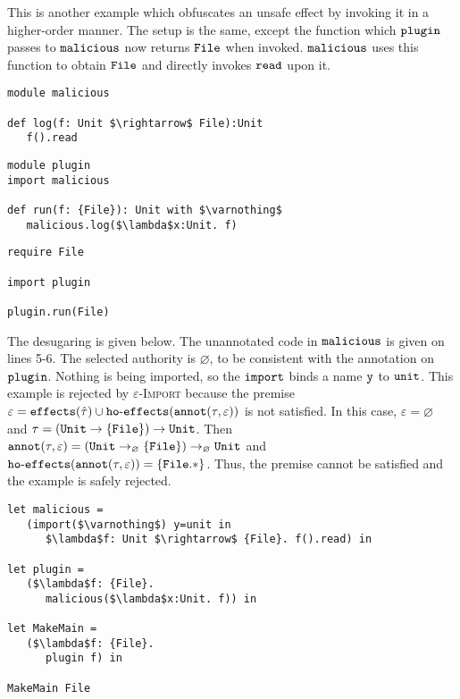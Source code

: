 This is another example which obfuscates an unsafe effect by invoking it in a higher-order manner. The setup is the same, except the function which $\mathtt{plugin}$ passes to $\mathtt{malicious}$ now returns $\mathtt{File}$ when invoked. $\mathtt{malicious}$ uses this function to obtain $\mathtt{File}$ and directly invokes $\mathtt{read}$ upon it.

\begin{lstlisting}
module malicious

def log(f: Unit $\rightarrow$ File):Unit
   f().read
\end{lstlisting}

\begin{lstlisting}
module plugin
import malicious

def run(f: {File}): Unit with $\varnothing$
   malicious.log($\lambda$x:Unit. f)
\end{lstlisting}

\begin{lstlisting}
require File

import plugin

plugin.run(File)
\end{lstlisting}

The desugaring is given below. The unannotated code in $\mathtt{malicious}$ is given on lines 5-6. The selected authority is $\varnothing$, to be consistent with the annotation on $\mathtt{plugin}$. Nothing is being imported, so the $\mathtt{import}$ binds a name $\mathtt{y}$ to $\mathtt{unit}$. This example is rejected by \textsc{$\varepsilon$-Import} because the premise $\varepsilon = \mathtt{effects}(\hat \tau) \cup \mathtt{ho \hbox{-} effects}(\mathtt{annot}(\tau, \varepsilon))$ is not satisfied. In this case, $\varepsilon = \varnothing$ and $\tau = \mathtt{ (Unit \rightarrow \{ File \}) \rightarrow Unit }$. Then $\mathtt{annot}(\tau, \varepsilon) = \mathtt{ (Unit \rightarrow_{\varnothing} \{ File \}) \rightarrow_{\varnothing} Unit }$ and $\mathtt{ho \hbox{-} effects}(\mathtt{annot}(\tau, \varepsilon)) = \{ \mathtt{File.*} \}$. Thus, the premise cannot be satisfied and the example is safely rejected.


\begin{lstlisting}
let malicious =
   (import($\varnothing$) y=unit in
      $\lambda$f: Unit $\rightarrow$ {File}. f().read) in

let plugin =
   ($\lambda$f: {File}.
      malicious($\lambda$x:Unit. f)) in

let MakeMain =
   ($\lambda$f: {File}.
      plugin f) in

MakeMain File
\end{lstlisting}